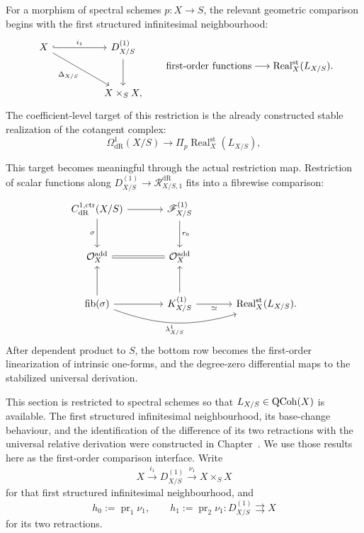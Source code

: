For a morphism of spectral schemes \(p:X\to S\), the relevant geometric
comparison begins with the first structured infinitesimal neighbourhood:
\[
\begin{tikzcd}[column sep=huge,row sep=large]
  X \arrow[r,hook,"i_1"] \arrow[dr,"\Delta_{X/S}"']
  & D^{(1)}_{X/S} \arrow[d]
  \\
  & X\times_SX,
\end{tikzcd}
\qquad
\text{first-order functions}
\longrightarrow
\operatorname{Real}^{\mathrm{st}}_X(L_{X/S}).
\]
The coefficient-level target of this restriction is the already constructed
stable realization of the cotangent complex:
\[
  \Omega^1_{\mathrm{dR}}(X/S)
  \longrightarrow
  \Pi_p\operatorname{Real}^{\mathrm{st}}_X(L_{X/S}),
\]

This target becomes meaningful through the actual restriction map. Restriction
of scalar functions along
\(D^{(1)}_{X/S}\to\mathcal R^{\mathrm{dR}}_{X/S,1}\) fits into a fibrewise
comparison:
\[
\begin{tikzcd}[column sep=large,row sep=large]
  C^{1,\mathrm{ctr}}_{\mathrm{dR}}(X/S)
      \arrow[r]
      \arrow[d,"\sigma"']
  &
  \mathscr F^{(1)}_{X/S}
      \arrow[d,"r_0"]
  \\
  \mathcal O_X^{\mathrm{add}}
      \arrow[r,equal]
  &
  \mathcal O_X^{\mathrm{add}}
  \\
  \operatorname{fib}(\sigma)
      \arrow[u]
      \arrow[r]
      \arrow[rr,bend right=18,"\mathscr\lambda^1_{X/S}"']
  &
  K^{(1)}_{X/S}
      \arrow[u]
      \arrow[r,"\simeq"']
  &
  \operatorname{Real}^{\mathrm{st}}_X(L_{X/S}) .
\end{tikzcd}
\]
After dependent product to \(S\), the bottom row becomes the first-order
linearization of intrinsic one-forms, and the degree-zero differential maps to
the stabilized universal derivation.

This section is restricted to spectral schemes so that
\(L_{X/S}\in\operatorname{QCoh}(X)\) is available. The first structured infinitesimal
neighbourhood, its base-change behaviour, and the identification of the
difference of its two retractions with the universal relative derivation were
constructed in Chapter~. We use
those results here as the first-order comparison interface.
Write
\[
  X\xrightarrow{i_1}D^{(1)}_{X/S}
  \xrightarrow{\nu_1}X\times_SX
\]
for that first structured infinitesimal neighbourhood, and
\[
  h_0:=\operatorname{pr}_1\nu_1,
  \qquad
  h_1:=\operatorname{pr}_2\nu_1
  :D^{(1)}_{X/S}\rightrightarrows X
\]
for its two retractions.

